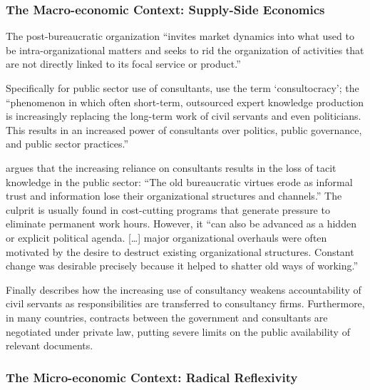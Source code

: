 \documentclass[12pt]{article}
\begin{document}
\hypertarget{the-macro-economic-context-supply-side-economics}{%
\subsubsection{The Macro-economic Context: Supply-Side
Economics}\label{the-macro-economic-context-supply-side-economics}}

The post-bureaucratic organization ``invites market dynamics into what
used to be intra-organizational matters and seeks to rid the
organization of activities that are not directly linked to its focal
service or product.'' \citep[ 3]{furusten2000}

Specifically for public sector use of consultants,
\citet[242]{ylonen2019} use the term `consultocracy'; the ``phenomenon
in which often short-term, outsourced expert knowledge production is
increasingly replacing the long-term work of civil servants and even
politicians. This results in an increased power of consultants over
politics, public governance, and public sector practices.''

\citet[250]{ylonen2019} argues that the increasing reliance on
consultants results in the loss of tacit knowledge in the public sector:
``The old bureaucratic virtues erode as informal trust and information
lose their organizational structures and channels.'' The culprit is
usually found in cost-cutting programs that generate pressure to
eliminate permanent work hours. However, it ``can also be advanced as a
hidden or explicit political agenda. {[}\ldots{]} major organizational
overhauls were often motivated by the desire to destruct existing
organizational structures. Constant change was desirable precisely
because it helped to shatter old ways of working.''

Finally \citet[252]{ylonen2019} describes how the increasing use of
consultancy weakens accountability of civil servants as responsibilities
are transferred to consultancy firms. Furthermore, in many countries,
contracts between the government and consultants are negotiated under
private law, putting severe limits on the public availability of
relevant documents.

\hypertarget{the-micro-economic-context-radical-reflexivity}{%
\subsubsection{The Micro-economic Context: Radical
Reflexivity}\label{the-micro-economic-context-radical-reflexivity}}
\end{document}
